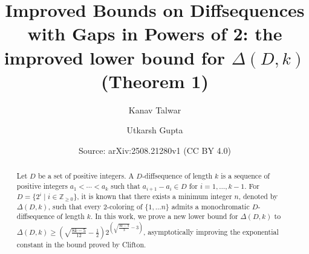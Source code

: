 \documentclass[10pt,a4paper]{amsart}
\title[Improved Bounds on Diffsequences]{Improved Bounds on Diffsequences with Gaps in Powers of 2: the improved lower bound for $\Delta(D,k)$ (Theorem 1)}
\author{Kanav Talwar}
\author{Utkarsh Gupta}
\date{Source: arXiv:2508.21280v1 (CC BY 4.0)}
\begin{document}
\begin{abstract}
Let $D$ be a set of positive integers. A $D$-diffsequence of length $k$ is a sequence of positive integers $a_1 <  \cdots < a_k$ such that $a_{i+1}-a_i\in D$ for $i=1,\ldots,k-1$. For $D=\{2^i\mid i\in \mathbb{Z}_{\ge 0}\}$, it is known that there exists a minimum integer $n$, denoted by $\Delta(D,k)$, such that every $2$-coloring of $\{1,\ldots n \}$ admits a monochromatic $D$-diffsequence of length $k$. In this work, we prove a new lower bound for $\Delta(D,k)$ to $\Delta(D,k)\ge \left(\sqrt{\frac{8k-5}{12}}-\frac12\right)2^{\left(\sqrt{\frac{8k-5}{3}}-3\right)}$, asymptotically improving the exponential constant in the bound proved by Clifton.
\end{abstract}
\maketitle
\end{document}
